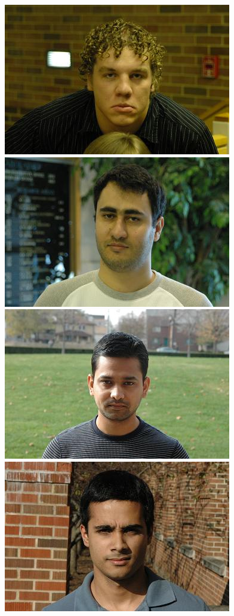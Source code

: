 \documentclass[12pt,journal,draftcls,letterpaper,onecolumn]{IEEEtran}
\begin{document}
\begin{figure}
\includegraphics[scale=0.75,clip=true]{figures_pami/uiuc_example/normal_indoor/DSC_1941.JPG}
\includegraphics[scale=0.75,clip=true]{figures_pami/uiuc_example/normal_indoor/DSC_3766.JPG} \\
\vspace{2mm}
\centering
\includegraphics[scale=0.75,clip=true]{figures_pami/uiuc_example/normal_outdoor/DSC_1574.JPG}
\includegraphics[scale=0.75,clip=true]{figures_pami/uiuc_example/normal_outdoor/DSC_1622.JPG}

\end{figure}
\end{document}
